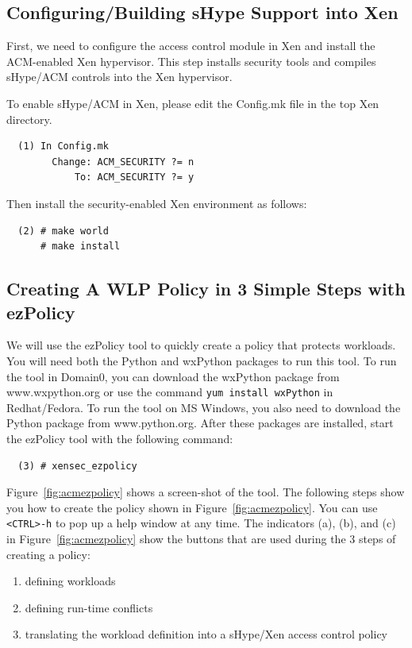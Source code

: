 \documentclass[11pt,twoside,final,openright]{report}
\begin{document}
\subsection{Configuring/Building sHype Support into Xen}
\label{subsection:acmexampleconfigure}
First, we need to configure the access control module in Xen and
install the ACM-enabled Xen hypervisor. This step installs security
tools and compiles sHype/ACM controls into the Xen hypervisor.

To enable sHype/ACM in Xen, please edit the Config.mk file in the top
Xen directory.

\begin{verbatim}
  (1) In Config.mk
        Change: ACM_SECURITY ?= n
            To: ACM_SECURITY ?= y
\end{verbatim}

Then install the security-enabled Xen environment as follows:

\begin{verbatim}
  (2) # make world
      # make install
\end{verbatim}

\subsection{Creating A WLP Policy in 3 Simple Steps with ezPolicy}
\label{subsection:acmexamplecreate}

We will use the ezPolicy tool to quickly create a policy that protects
workloads.  You will need both the Python and wxPython packages to run
this tool.  To run the tool in Domain0, you can download the wxPython
package from www.wxpython.org or use the command
\verb|yum install wxPython| in Redhat/Fedora. To run the tool on MS
Windows, you also need to download the Python package from
www.python.org. After these packages are installed, start the ezPolicy
tool with the following command:

\begin{verbatim}
  (3) # xensec_ezpolicy
\end{verbatim}

Figure~\ref{fig:acmezpolicy} shows a screen-shot of the tool. The
following steps show you how to create the policy shown in
Figure~\ref{fig:acmezpolicy}.  You can use \verb|<CTRL>-h| to pop up a
help window at any time. The indicators (a), (b), and (c) in
Figure~\ref{fig:acmezpolicy} show the buttons that are used during the
3 steps of creating a policy:
\begin{enumerate}
\item defining workloads
\item defining run-time conflicts
\item translating the workload definition into a sHype/Xen access
  control policy
\end{enumerate}
\end{document}

